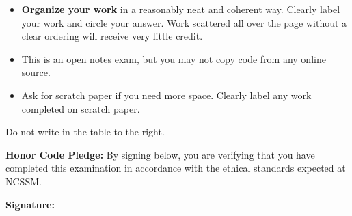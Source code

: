 \documentclass[11pt]{exam}
\begin{document}
\begin{minipage}[t]{3.7in}
\vspace{0pt}
\begin{itemize}

\item \textbf{Organize your work} in a reasonably neat and coherent way. Clearly label your work and circle your answer. Work scattered all over the page without a clear ordering will receive very little credit.

\item This is an open notes exam, but you may not copy code from any online source. 

\item Ask for scratch paper if you need more space. Clearly label any work completed on scratch paper.
\end{itemize}

Do not write in the table to the right.

\vspace{.5 in}

\textbf{Honor Code Pledge: }By signing below, you are verifying that you have completed this examination in accordance with the ethical standards expected at NCSSM.

\vspace{.5 in}

\textbf{Signature:} \makebox[2in]{\hrulefill}\\

\end{minipage}
\hfill
\begin{minipage}[t]{2.3in}
\vspace{0pt}
\addpoints %
\gradetable[v]%

\end{minipage}
\newpage %

%
%
%
\end{document}
